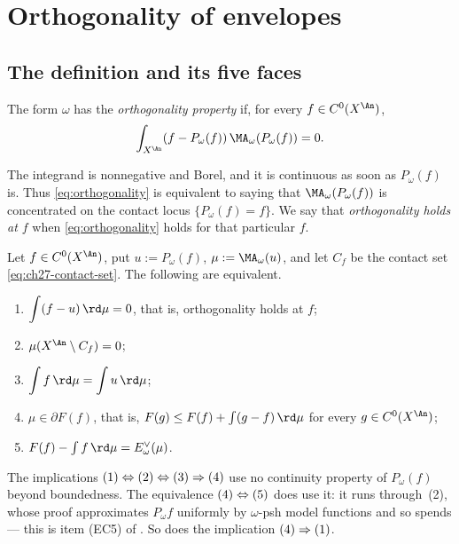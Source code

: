 \section{Orthogonality of envelopes}
\label{sec:ch27-orthogonality}

\subsection{The definition and its five faces}
\label{sec:ch27-orthogonality-definition}

\begin{definition}
\label{def:orthogonality-property}
The form $\omega$ has the \emph{orthogonality property} if, for every
$f\in C^0(X^{\An})$,
\begin{equation}\label{eq:orthogonality}
 \int_{X^{\An}}
     (f-P_\omega(f))\,
     \MA_\omega(P_\omega(f))=0.
\end{equation}
\end{definition}

The integrand is nonnegative and Borel, and it is continuous as soon as
$P_\omega(f)$ is.  Thus \eqref{eq:orthogonality} is equivalent to saying
that $\MA_\omega(P_\omega(f))$ is concentrated on the contact locus
$\{P_\omega(f)=f\}$.  We say that \emph{orthogonality holds at $f$} when
\eqref{eq:orthogonality} holds for that particular $f$.

\begin{proposition}
\label{prop:ch27-orthogonality-equivalences}
Let $f\in C^0(X^{\An})$, put $u:=P_\omega(f)$,
$\mu:=\MA_\omega(u)$, and let $C_f$ be the contact set
\eqref{eq:ch27-contact-set}.  The following are equivalent.
\begin{enumerate}
\item $\displaystyle\int(f-u)\,\rd\mu=0$, that is, orthogonality holds at
$f$;
\item $\mu(X^{\An}\setminus C_f)=0$;
\item $\displaystyle\int f\,\rd\mu=\int u\,\rd\mu$;
\item $\mu\in\partial F(f)$, that is,
$F(g)\leq F(f)+\int(g-f)\,\rd\mu$ for every $g\in C^0(X^{\An})$;
\item $F(f)-\int f\,\rd\mu=E^\vee_\omega(\mu)$.
\end{enumerate}
The implications
$\textup{(1)}\Leftrightarrow\textup{(2)}\Leftrightarrow\textup{(3)}
\Rightarrow\textup{(4)}$
use no continuity property of $P_\omega(f)$ beyond boundedness.  The
equivalence $\textup{(4)}\Leftrightarrow\textup{(5)}$ does use it: it runs
through \,(2), whose proof
approximates $P_\omega f$ uniformly by $\omega$-psh model functions and
so spends  --- this is item
\textup{(EC5)} of .  So does the implication
$\textup{(4)}\Rightarrow\textup{(1)}$.
\end{proposition}

